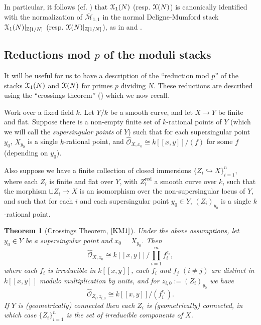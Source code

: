 \documentclass[11pt]{amsart}
\newtheorem{theorem}[subsection]{Theorem}
\theoremstyle{definition}
\begin{document}
In particular, it follows (cf. \cite[4.1.5]{C}) that ${\mathbf{\EuScript{X}}}_1(N)$ (resp. ${\mathbf{\EuScript{X}}}(N)$) is canonically identified with the normalization of $\overline{\mathcal{M}}_{1,1}$ in the normal Deligne-Mumford stack ${\mathbf{\EuScript{X}}}_1(N)|_{\mathbb{Z}[1/N]}$ (resp. ${\mathbf{\EuScript{X}}}(N)|_{\mathbb{Z}[1/N]}$), as in \cite[\S8.6]{KM1} and \cite[\S$\textrm{VII.2}$]{DR}.

\subsection*{Reductions mod $p$ of the moduli stacks}

It will be useful for us to have a description of the ``reduction mod $p$'' of the stacks ${\mathbf{\EuScript{X}}}_1(N)$ and ${\mathbf{\EuScript{X}}}(N)$ for primes $p$ dividing $N$. These reductions are described using the ``crossings theorem'' (\cite[13.1.3]{KM1}) which we now recall.

Work over a fixed field $k$. Let $Y/k$ be a smooth curve, and let $X \rightarrow Y$ be finite and flat. Suppose there is a non-empty finite set of $k$-rational points of $Y$ (which we will call the \textit{supersingular points} of $Y$) such that for each supersingular point $y_0$, $X_{y_0}$ is a single $k$-rational point, and $\widehat{\mathcal{O}}_{X,x_0} \cong k[\![ x,y]\!]/(f)$ for some $f$ (depending on $y_0$).

Also suppose we have a finite collection of closed immersions $\{Z_i \hookrightarrow X\}_{i = 1}^n$, where each $Z_i$ is finite and flat over $Y$, with $Z_i^{\mathrm{red}}$ a smooth curve over $k$, such that the morphism $\sqcup Z_i \rightarrow X$ is an isomorphism over the non-supersingular locus of $Y$, and such that for each $i$ and each supersingular point $y_0 \in Y$, $(Z_i)_{y_0}$ is a single $k$-rational point.

\begin{theorem}[Crossings Theorem, $\textrm{\cite[13.1.3]{KM1}}$]\label{crossings}
Under the above assumptions, let $y_0 \in Y$ be a supersingular point and $x_0 = X_{y_0}$. Then 
\begin{displaymath}
\widehat{\mathcal{O}}_{X,x_0} \cong k[\![x,y]\!]/\prod_{i = 1}^m f_i^{e_i},
\end{displaymath}
where each $f_i$ is irreducible in $k[\![x,y]\!]$, each $f_i$ and $f_j$ $(i\neq j)$ are distinct in $k[\![x,y]\!]$ modulo multiplication by units, and for $z_{i,0} := (Z_i)_{y_0}$ we have 
\begin{displaymath}
\widehat{\mathcal{O}}_{Z_i,z_{i,0}} \cong k[\![x,y]\!]/(f_i^{e_i}).
\end{displaymath}
If $Y$ is (geometrically) connected then each $Z_i$ is (geometrically) connected, in which case $\{Z_i\}_{i = 1}^n$ is the set of irreducible components of $X$.
\end{theorem}
\end{document}
